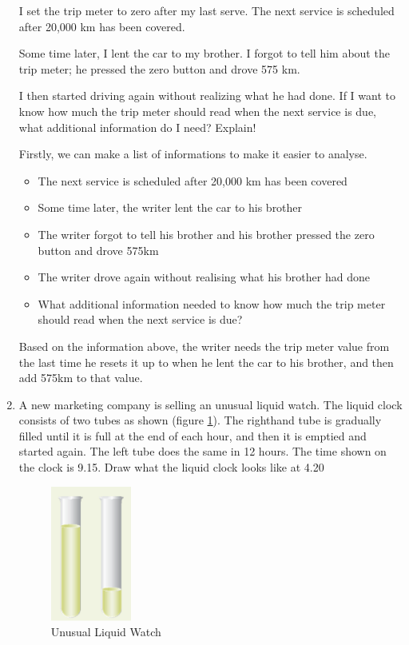 \documentclass[12pt,titlepage]{article}
\begin{document}
\begin{enumerate}
{        I set the trip meter to zero after my last serve. The next service is scheduled after 20,000 km has been covered.

        Some time later, I lent the car to my brother. I forgot to tell him about the trip meter; he pressed the zero button and drove 575 km.

        I then started driving again without realizing what he had done.
        If I want to know how much the trip meter should read when the next service is due, what additional information do I need?
        Explain!

        Firstly, we can make a list of informations to make it easier to analyse.
        \begin{itemize}
            \item The next service is scheduled after 20,000 km has been covered
            \item Some time later, the writer lent the car to his brother
            \item The writer forgot to tell his brother and his brother pressed the zero button and drove 575km
            \item The writer drove again without realising what his brother had done
            \item What additional information needed to know how much the trip meter should read when the next service is due?
        \end{itemize}

        Based on the information above, the writer needs the trip meter value from the last time he resets it up to when he lent the car to his brother, and then add 575km to that value.
    }
    \pagebreak
    \item {
        A new marketing company is selling an unusual liquid watch.
        The liquid clock consists of two tubes as shown (figure \ref{liquid}). The righthand tube is gradually filled until it is full at the end of each
        hour, and then it is emptied and started again. The left tube
        does the same in 12 hours. The time shown on the clock is 9.15.
        Draw what the liquid clock looks like at 4.20

        \begin{figure}[h]
            \centering
            \includegraphics[width=0.25\textwidth]{./images/unusual-liquid.png}
            \caption{Unusual Liquid Watch}
            \label{liquid}
        \end{figure}

}
\end{enumerate}
\end{document}
